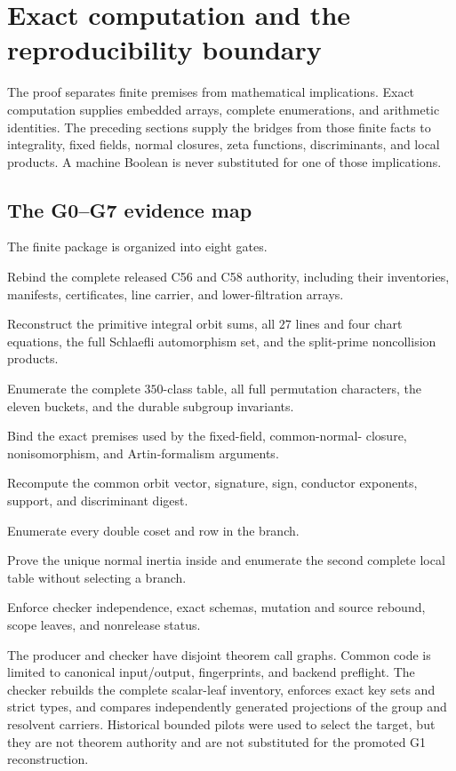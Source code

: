 \section{Exact computation and the reproducibility boundary}
\label{sec:reproducibility}

The proof separates finite premises from mathematical implications.  Exact
computation supplies embedded arrays, complete enumerations, and arithmetic
identities.  The preceding sections supply the bridges from those finite
facts to integrality, fixed fields, normal closures, zeta functions,
discriminants, and local products.  A machine Boolean is never substituted
for one of those implications.

\subsection{The G0--G7 evidence map}

The finite package is organized into eight gates.
\begin{description}[leftmargin=3.2em,style=nextline]
\item[G0] Rebind the complete released C56 and C58 authority, including their
inventories, manifests, certificates, line carrier, and lower-filtration
arrays.
\item[G1] Reconstruct the primitive integral orbit sums, all $27$ lines and
four chart equations, the full Schlaefli automorphism set, and the split-prime
noncollision products.
\item[G2] Enumerate the complete $350$-class table, all full permutation
characters, the eleven buckets, and the durable subgroup invariants.
\item[G3] Bind the exact premises used by the fixed-field, common-normal-
closure, nonisomorphism, and Artin-formalism arguments.
\item[G4] Recompute the common orbit vector, signature, sign, conductor
exponents, support, and discriminant digest.
\item[G5] Enumerate every double coset and row in the  branch.
\item[G6] Prove the unique normal  inertia inside  and
enumerate the second complete local table without selecting a branch.
\item[G7] Enforce checker independence, exact schemas, mutation and source
rebound, scope leaves, and nonrelease status.
\end{description}

The producer and checker have disjoint theorem call graphs.  Common code is
limited to canonical input/output, fingerprints, and backend preflight.  The
checker rebuilds the complete scalar-leaf inventory, enforces exact key sets
and strict types, and compares independently generated projections of the
group and resolvent carriers.  Historical bounded pilots were used to select
the target, but they are not theorem authority and are not substituted for
the promoted G1 reconstruction.

